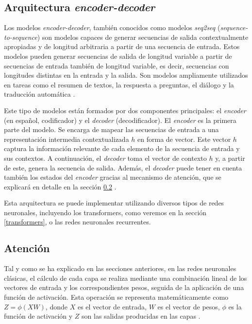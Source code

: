 \documentclass[11pt,spanish,listoffigures,listoftables]{tfgetsinf}
\begin{document}
\subsection{Arquitectura \textit{encoder-decoder}} \label{encdec}

Los modelos \textit{encoder-decoder}, también conocidos como modelos \textit{seq2seq} (\textit{sequence-to-sequence}) son modelos capaces de generar secuencias de salida contextualmente apropiadas y de longitud arbitraria a partir de una secuencia de entrada. Estos modelos pueden generar secuencias de salida de longitud variable a partir de secuencias de entrada también de longitud variable, es decir, secuencias con longitudes distintas en la entrada y la salida.
Son modelos ampliamente utilizados en tareas como el resumen de textos, la respuesta a preguntas, el diálogo y la traducción automática \cite{jurafsky2023speech}.

Este tipo de modelos están formados por dos componentes principales: el \textit{encoder} (en español, codificador) y el \textit{decoder} (decodificador). El \textit{encoder} es la primera parte del modelo. Se encarga de mapear las secuencias de entrada a una representación intermedia contextualizada $h$ en forma de vector. Este vector $h$ captura la información relevante de cada elemento de la secuencia de entrada y sus contextos. A continuación, el \textit{decoder} toma el vector de contexto $h$ y, a partir de este, genera la secuencia de salida. Además, el \textit{decoder} puede tener en cuenta también los estados del \textit{encoder} gracias al mecanismo de atención, que se explicará en detalle en la sección \ref{atencion} \cite{sriram2017coldfusiontrainingseq2seq}.

Esta arquitectura se puede implementar utilizando diversos tipos de redes neuronales, incluyendo los transformers, como veremos en la sección \ref{transformers}, o las redes neuronales recurrentes.

\subsection{Atención} \label{atencion}

Tal y como se ha explicado en las secciones anteriores, en las redes neuronales clásicas, el cálculo de cada capa se realiza mediante una combinación lineal de los vectores de entrada y los correspondientes pesos, seguida de la aplicación de una función de activación. Esta operación se representa matemáticamente como $Z = \phi(XW)$, donde $X$ es el vector de entrada, $W$ es el vector de pesos, $\phi$ es la función de activación y $Z$ son las salidas producidas en las capas \cite{murphy2022probabilistic}. 
\end{document}
